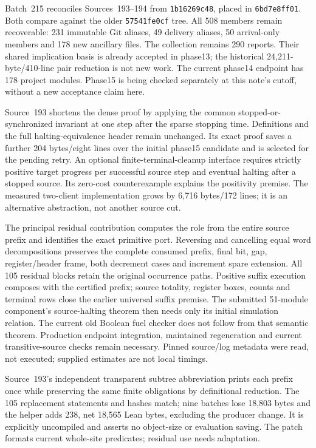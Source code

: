 \documentclass[11pt]{article}
\begin{document}
{Batch~215 reconciles Sources~193--194 from \texttt{1b16269c48}, placed in
\texttt{6bd7e8ff01}. Both compare against the older \texttt{57541fe0cf} tree.
All 508 members remain recoverable: 231 immutable Git aliases, 49 delivery
aliases, 50 arrival-only members and 178 new ancillary files. The collection
remains 290 reports. Their shared implication basis is already accepted in
phase13; the historical 24,211-byte/410-line pair reduction is not new work.
The current phase14 endpoint has 178 project modules. Phase15 is being checked
separately at this note's cutoff, without a new acceptance claim here.

Source~193 shortens the dense proof by applying the common stopped-or-synchronized
invariant at one step after the sparse stopping time. Definitions and the full
halting-equivalence header remain unchanged. Its exact proof saves a further
204 bytes/eight lines over the initial phase15 candidate and is selected for the
pending retry. An optional finite-terminal-cleanup interface requires strictly
positive target progress per successful source step and eventual halting after
a stopped source. Its zero-cost counterexample explains the positivity premise.
The measured two-client implementation grows by 6,716 bytes/172 lines; it is an
alternative abstraction, not another source cut.

The principal residual contribution computes the role from the entire source
prefix and identifies the exact primitive port. Reversing and cancelling equal
word decompositions preserves the complete consumed prefix, final bit, gap,
register/header frame, both decrement cases and increment spare extension.
All 105 residual blocks retain the original occurrence paths. Positive suffix
execution composes with the certified prefix; source totality, register boxes,
counts and terminal rows close the earlier universal suffix premise. The submitted
51-module component's source-halting theorem then needs only its initial
simulation relation. The current old Boolean fuel checker does not follow from
that semantic theorem. Production endpoint integration, maintained regeneration
and current transitive-source checks remain necessary. Pinned source/log metadata
were read, not executed; supplied estimates are not local timings.

Source~193's independent transparent subtree abbreviation prints each prefix
once while preserving the same finite obligations by definitional reduction.
The 105 replacement statements and hashes match; nine batches lose 18,803 bytes
and the helper adds 238, net 18,565 Lean bytes, excluding the producer change.
It is explicitly uncompiled and asserts no object-size or evaluation saving.
The patch formats current whole-site predicates; residual use needs adaptation.

}
\end{document}
